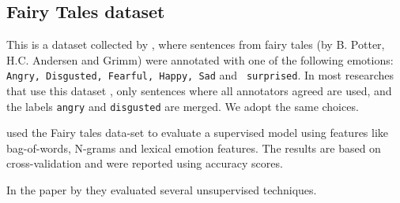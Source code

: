 \documentclass[11pt]{article}
\newcommand{\note}[1]{\textbf{*** #1 ***}}
\begin{document}


\subsection{Fairy Tales dataset}
This is a dataset collected by , where sentences from fairy tales (by B. Potter, H.C. Andersen and Grimm) were annotated with one of the following emotions: \texttt{Angry, Disgusted, Fearful, Happy, Sad} and \texttt{ surprised}. In most researches that use this dataset \cite{kim2010evaluation,calvo2013emotions,chaffar2011using}, only sentences where all annotators agreed are used, and the labels \texttt{angry} and \texttt{disgusted} are merged. We adopt the same choices.



 
 used the Fairy tales data-set to evaluate a supervised model using features like bag-of-words, N-grams and lexical emotion features. 
The results are based on cross-validation and were reported using accuracy scores.

In the paper by \cite{kim2010evaluation} they evaluated several unsupervised techniques.



\end{document}
